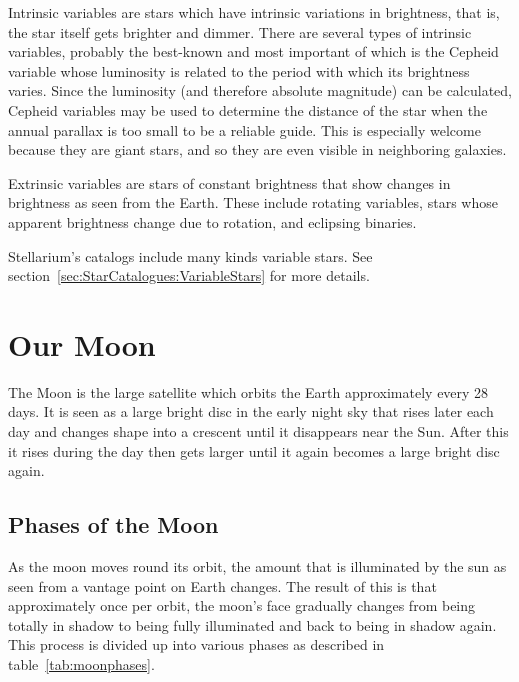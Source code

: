 Intrinsic variables are stars which have intrinsic variations in
brightness, that is, the star itself gets brighter and dimmer. There
are several types of intrinsic variables, probably the best-known and
most important of which is the Cepheid variable whose luminosity is
related to the period with which its brightness varies. Since the
luminosity (and therefore absolute magnitude) can be calculated,
Cepheid variables may be used to determine the distance of the star
when the annual parallax is too small to be a reliable guide. This is
especially welcome because they are giant stars, and so they are even
visible in neighboring galaxies.

Extrinsic variables are stars of constant brightness that show changes
in brightness as seen from the Earth. These include rotating variables,
stars whose apparent brightness change due to rotation, and eclipsing
binaries.

Stellarium's catalogs include many kinds variable stars. 
See section~\ref{sec:StarCatalogues:VariableStars} for more details. 

\section{Our Moon}
\label{sec:Moon}

The Moon is the large satellite which orbits the Earth approximately
every 28 days. It is seen as a large bright disc in the early night sky
that rises later each day and changes shape into a crescent until it
disappears near the Sun. After this it rises during the day then gets
larger until it again becomes a large bright disc again.

\subsection{Phases of the Moon}
\label{sec:Moon:Phases}

As the moon moves round its orbit, the amount that is illuminated by the
sun as seen from a vantage point on Earth changes. The result of this is
that approximately once per orbit, the moon's face gradually changes
from being totally in shadow to being fully illuminated and back to
being in shadow again. This process is divided up into various phases as
described in table~\ref{tab:moonphases}.


